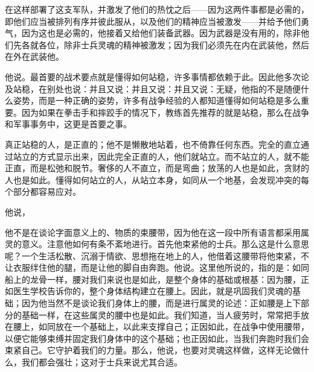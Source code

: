 \par

在这样部署了这支军队，并激发了他们的热忱之后——因为这两件事都是必需的，即他们应当被排列有序并彼此服从，以及他们的精神应当被激发——并给予他们勇气，因为这也是必需的，他接着又给他们装备武器。因为武器是没有用的，除非他们先各就各位，除非士兵灵魂的精神被激发；因为我们必须先在内在武装他，然后在外在武装他。\par

他说。最首要的战术要点就是懂得如何站稳，许多事情都依赖于此。因此他多次论及站稳，在别处也说：并且又说：并且又说：并且又说：无疑，他指的不是随便什么姿势，而是一种正确的姿势，许多有战争经验的人都知道懂得如何站稳是多么重要。因为如果在拳击手和摔跤手的情况下，教练首先推荐的就是站稳，那么在战争和军事事务中，这更是首要之事。\par

真正站稳的人，是正直的；他不是懒散地站着，也不倚靠任何东西。完全的直立通过站立的方式显示出来，因此完全正直的人，他们就站立。而不站立的人，就不能正直，而是松弛和脱节。奢侈的人不直立，而是弯曲；放荡的人也是如此，贪财的人也是如此。懂得如何站立的人，从站立本身，如同从一个地基，会发现冲突的每个部分都容易应对。\par

他说，\par

他不是在谈论字面意义上的、物质的束腰带，因为他在这一段中所有语言都采用属灵的意义。注意他如何有条不紊地进行。首先他束紧他的士兵。那么这是什么意思呢？一个生活松散、沉溺于情欲、思想拖在地上的人，他借着这腰带将他束紧，不让衣服绊住他的腿，而是让他的脚自由奔跑。他说。这里他所说的，指的是：如同船上的龙骨一样，腰对我们来说也是如此，是整个身体的基础或根基：因为腰，正如医生学校告诉你的，整个身体结构建立在腰上。因此，就是巩固我们灵魂的基础；因为他当然不是谈论我们身体上的腰，而是进行属灵的论述：正如腰是上下部分的基础一样，在这些属灵的腰中也是如此。我们知道，当人疲劳时，常常把手放在腰上，如同放在一个基础上，以此来支撑自己；正因如此，在战争中使用腰带，以便它能够束缚并固定我们身体中的这个基础；也正因如此，当我们奔跑时我们会束紧自己。它守护着我们的力量。那么，他说，也要对灵魂这样做，这样无论做什么，我们都会强壮；这对于士兵来说尤其合适。\par

